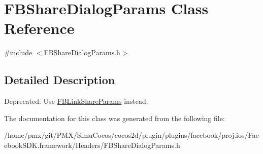 \hypertarget{classFBShareDialogParams}{}\section{F\+B\+Share\+Dialog\+Params Class Reference}
\label{classFBShareDialogParams}


{\ttfamily \#include $<$F\+B\+Share\+Dialog\+Params.\+h$>$}



\subsection{Detailed Description}
Deprecated. Use {\ttfamily \hyperlink{interfaceFBLinkShareParams}{F\+B\+Link\+Share\+Params}} instead. 

The documentation for this class was generated from the following file\+:\begin{DoxyCompactItemize}
\item 
/home/pmx/git/\+P\+M\+X/\+Simu\+Cocos/cocos2d/plugin/plugins/facebook/proj.\+ios/\+Facebook\+S\+D\+K.\+framework/\+Headers/F\+B\+Share\+Dialog\+Params.\+h\end{DoxyCompactItemize}
